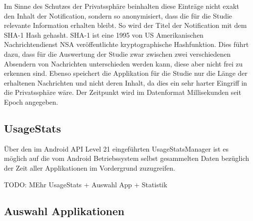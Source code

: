 Im Sinne des Schutzes der Privatssphäre beinhalten diese Einträge nicht exakt den Inhalt der Notification, sondern so anonymisiert, dass die für die Studie relevante Information erhalten bleibt.
So wird der Titel der Notification mit dem SHA-1 Hash\cite{sha1def} gehasht.
SHA-1 ist eine 1995 von US Amerikanischen Nachrichtendienst NSA veröffentlichte kryptographische Hashfunktion\cite{sha1proposal}.
Dies führt dazu, dass für die Auswertung der Studie zwar zwischen zwei verschiedenen Absendern von Nachrichten unterschieden werden kann, diese aber nicht frei zu erkennen sind.
Ebenso speichert die Applikation für die Studie nur die Länge der erhaltenen Nachrichten und nicht deren Inhalt, da dies ein sehr harter Eingriff in die Privatssphäre wäre.
Der Zeitpunkt wird im Datenformat Millisekunden seit Epoch angegeben.


\subsection{UsageStats}

Über den im Android API Level 21 eingeführten UsageStatsManager ist es möglich 
auf die vom Android Betriebssystem selbst gesammelten Daten bezüglich der Zeit aller Applikationen im Vordergrund zuzugreifen.


TODO: MEhr UsageStats + Auswahl App + Statistik

\subsection{Auswahl Applikationen}

